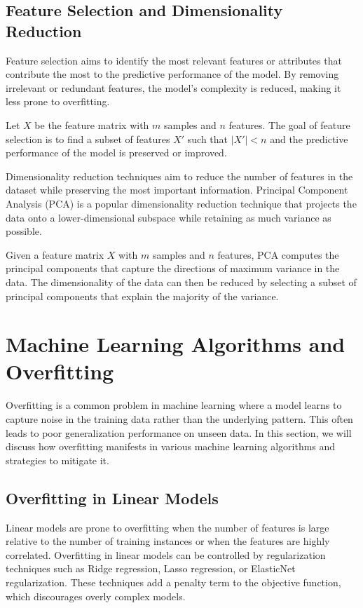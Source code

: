 \documentclass[12pt]{book} %
\begin{document}
\subsection{Feature Selection and Dimensionality Reduction}
Feature selection aims to identify the most relevant features or attributes that contribute the most to the predictive performance of the model. By removing irrelevant or redundant features, the model's complexity is reduced, making it less prone to overfitting.

Let \(X\) be the feature matrix with \(m\) samples and \(n\) features. The goal of feature selection is to find a subset of features \(X'\) such that \(|X'| < n\) and the predictive performance of the model is preserved or improved.

Dimensionality reduction techniques aim to reduce the number of features in the dataset while preserving the most important information. Principal Component Analysis (PCA) is a popular dimensionality reduction technique that projects the data onto a lower-dimensional subspace while retaining as much variance as possible.

Given a feature matrix \(X\) with \(m\) samples and \(n\) features, PCA computes the principal components that capture the directions of maximum variance in the data. The dimensionality of the data can then be reduced by selecting a subset of principal components that explain the majority of the variance.

\section{Machine Learning Algorithms and Overfitting}

Overfitting is a common problem in machine learning where a model learns to capture noise in the training data rather than the underlying pattern. This often leads to poor generalization performance on unseen data. In this section, we will discuss how overfitting manifests in various machine learning algorithms and strategies to mitigate it.

\subsection{Overfitting in Linear Models}

Linear models are prone to overfitting when the number of features is large relative to the number of training instances or when the features are highly correlated. Overfitting in linear models can be controlled by regularization techniques such as Ridge regression, Lasso regression, or ElasticNet regularization. These techniques add a penalty term to the objective function, which discourages overly complex models.
\end{document}
